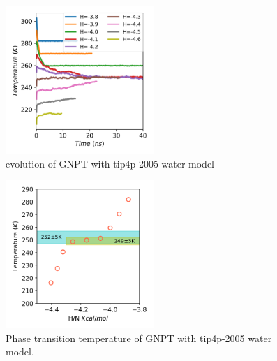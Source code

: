 \documentclass[aps,prl,twocolumn,superscriptaddress]{revtex4-1}
\begin{document}
\begin{figure}[ht]
\centering{}\includegraphics[width=0.5\textwidth]{PoteScan-2005.png} 
\caption{evolution of GNPT with tip4p-2005 water model
\label{fig:evolution-2005}} 
\end{figure}
\begin{figure}[ht]
\centering{}\includegraphics[width=0.5\textwidth]{PTtemp-2005.png} 
\caption{Phase transition temperature of GNPT with tip4p-2005 water model.
\label{fig:PTtemp-2005}} 
\end{figure}
\end{document}
